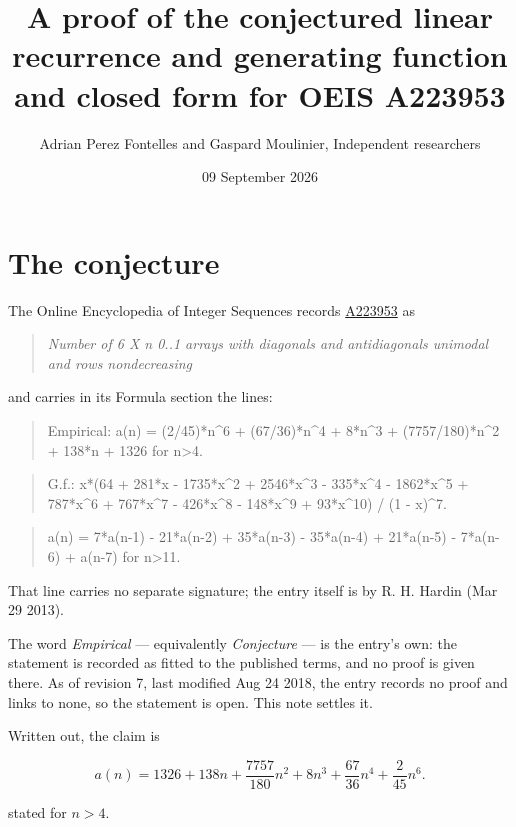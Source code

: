 \documentclass[11pt]{article}
\title{A proof of the conjectured linear recurrence and generating function and closed form for OEIS A223953}
\author{Adrian Perez Fontelles and Gaspard Moulinier, Independent researchers}
\date{09 September 2026}
\theoremstyle{definition}
\begin{document}
\maketitle
\section{The conjecture}

The Online Encyclopedia of Integer Sequences records \href{https://oeis.org/A223953}{A223953} as

\begin{quote}\itshape Number of 6 X n 0..1 arrays with diagonals and antidiagonals unimodal and rows nondecreasing\end{quote}

and carries in its Formula section the lines:

\begin{quote}\ttfamily Empirical: a(n) = (2/45)*n\textasciicircum{}6 + (67/36)*n\textasciicircum{}4 + 8*n\textasciicircum{}3 + (7757/180)*n\textasciicircum{}2 + 138*n + 1326 for n>4.\end{quote}

\begin{quote}\ttfamily G.f.: x*(64 + 281*x - 1735*x\textasciicircum{}2 + 2546*x\textasciicircum{}3 - 335*x\textasciicircum{}4 - 1862*x\textasciicircum{}5 + 787*x\textasciicircum{}6 + 767*x\textasciicircum{}7 - 426*x\textasciicircum{}8 - 148*x\textasciicircum{}9 + 93*x\textasciicircum{}10) / (1 - x)\textasciicircum{}7.\end{quote}

\begin{quote}\ttfamily a(n) = 7*a(n-1) - 21*a(n-2) + 35*a(n-3) - 35*a(n-4) + 21*a(n-5) - 7*a(n-6) + a(n-7) for n>11.\end{quote}

That line carries no separate signature; the entry itself is by R. H. Hardin (Mar 29 2013).

The word {\itshape Empirical} --- equivalently {\itshape Conjecture} --- is the entry's own: the statement is recorded as fitted to the published terms, and no proof is given there. As of revision 7, last modified Aug 24 2018, the entry records no proof and links to none, so the statement is open. This note settles it.

Written out, the claim is

\[a(n) = 1326 + 138n + \frac{7757}{180}n^{2} + 8n^{3} + \frac{67}{36}n^{4} + \frac{2}{45}n^{6}.\]

stated for $n > 4$.
\end{document}
